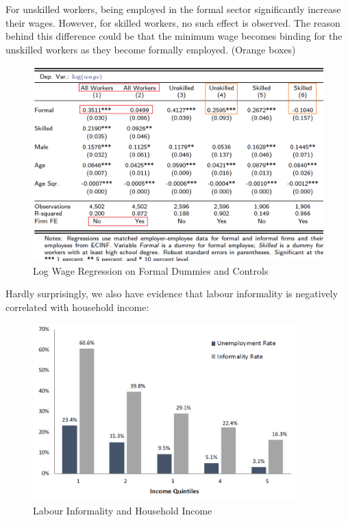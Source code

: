                For unskilled workers, being employed in the formal sector significantly increase their wages. However, for skilled workers, no such effect is observed. The reason behind this difference could be that the minimum wage becomes binding for the unskilled workers as they become formally employed. (Orange boxes)
                \begin{figure}[H]
                    \centering
                    \includegraphics[width=5in]{images/ch5/wage gaps.png}
                    \caption{Log Wage Regression on Formal Dummies and Controls}
                \end{figure}
                Hardly surprisingly, we also have evidence that labour informality is negatively correlated with household income:
                \begin{figure}[H]
                    \centering
                    \includegraphics[width=4in]{images/ch5/informality and income.png}
                    \caption{Labour Informality and Household Income}
                \end{figure}
            
